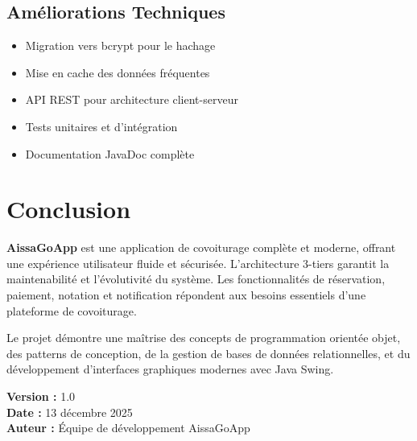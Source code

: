 \documentclass[12pt,a4paper]{report}
\begin{document}
\section{Améliorations Techniques}

\begin{itemize}
    \item Migration vers bcrypt pour le hachage
    \item Mise en cache des données fréquentes
    \item API REST pour architecture client-serveur
    \item Tests unitaires et d'intégration
    \item Documentation JavaDoc complète
\end{itemize}

\chapter{Conclusion}

\textbf{AissaGoApp} est une application de covoiturage complète et moderne, offrant une expérience utilisateur fluide et sécurisée. L'architecture 3-tiers garantit la maintenabilité et l'évolutivité du système. Les fonctionnalités de réservation, paiement, notation et notification répondent aux besoins essentiels d'une plateforme de covoiturage.

Le projet démontre une maîtrise des concepts de programmation orientée objet, des patterns de conception, de la gestion de bases de données relationnelles, et du développement d'interfaces graphiques modernes avec Java Swing.

\vspace{1cm}

\begin{center}
\begin{tcolorbox}[colback=brandcolor!10,colframe=brandcolor,width=0.8\textwidth]
\centering
\textbf{Version :} 1.0\\
\textbf{Date :} 13 décembre 2025\\
\textbf{Auteur :} Équipe de développement AissaGoApp
\end{tcolorbox}
\end{center}
\end{document}
